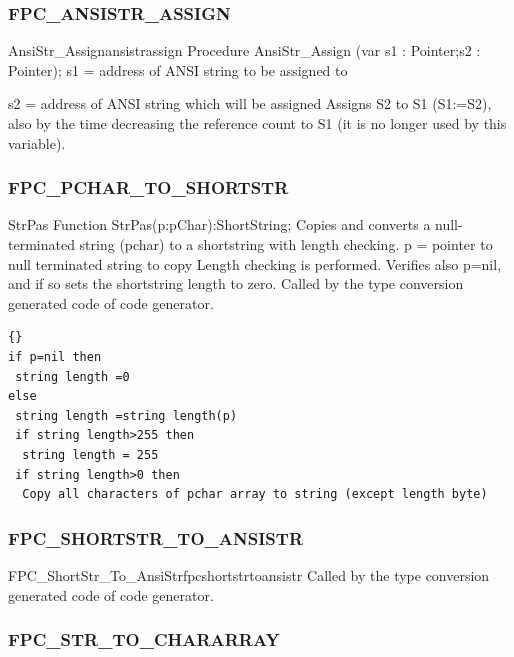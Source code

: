\documentclass [a4paper,12pt]{article}
\begin{document}
\subsubsection{FPC{\_}ANSISTR{\_}ASSIGN }
\label{subsubsec:mylabel43}

\begin{functionl}{AnsiStr{\_}Assign}{ansistrassign}
\Declaration
Procedure AnsiStr{\_}Assign (var s1 : Pointer;s2 : Pointer);
\Parameters
s1 = address of ANSI string to be assigned to  \par
s2 = address of ANSI string which will be assigned
\Algorithm
Assigns S2 to S1 (S1:=S2), also by the time decreasing the reference count
to S1 (it is no longer used by this variable).
\end{functionl}

\subsubsection{FPC{\_}PCHAR{\_}TO{\_}SHORTSTR}
\label{subsubsec:mylabel44}

\begin{function}{StrPas}
\Declaration
Function StrPas(p:pChar):ShortString;
\Description
Copies and converts a null-terminated string (pchar) to a shortstring with
length checking.
\Parameters
p = pointer to null terminated string to copy
\Notes
Length checking is performed. Verifies also p=nil, and if so sets the
shortstring length to zero. Called by the type conversion generated code of
code generator.
\Algorithm
\begin{lstlisting}{}
if p=nil then
 string length =0
else
 string length =string length(p)
 if string length>255 then
  string length = 255
 if string length>0 then
  Copy all characters of pchar array to string (except length byte)
\end{lstlisting}
\end{function}

\subsubsection{FPC{\_}SHORTSTR{\_}TO{\_}ANSISTR}
\label{subsubsec:mylabel45}

\begin{functionl}{FPC{\_}ShortStr{\_}To{\_}AnsiStr}{fpcshortstrtoansistr}
\Notes
Called by the type conversion generated code of code generator.
\end{functionl}

\subsubsection{FPC{\_}STR{\_}TO{\_}CHARARRAY}
\label{subsubsec:mylabel46}
\end{document}
